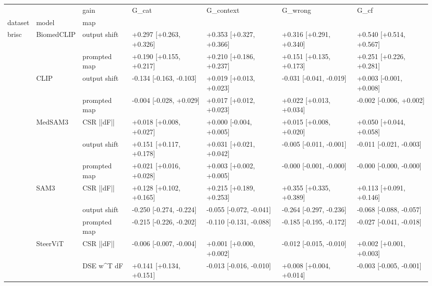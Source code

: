 \begin{tabular}{lllllll}
\toprule
 &  & gain & G_cat & G_context & G_wrong & G_cf \\
dataset & model & map &  &  &  &  \\
\midrule
\multirow[t]{13}{*}{brisc} & \multirow[t]{2}{*}{BiomedCLIP} & output shift & +0.297 [+0.263, +0.326] & +0.353 [+0.327, +0.366] & +0.316 [+0.291, +0.340] & +0.540 [+0.514, +0.567] \\
 &  & prompted map & +0.190 [+0.155, +0.217] & +0.210 [+0.186, +0.237] & +0.151 [+0.135, +0.173] & +0.251 [+0.226, +0.281] \\
\cline{2-7}
 & \multirow[t]{2}{*}{CLIP} & output shift & -0.134 [-0.163, -0.103] & +0.019 [+0.013, +0.023] & -0.031 [-0.041, -0.019] & +0.003 [-0.001, +0.008] \\
 &  & prompted map & -0.004 [-0.028, +0.029] & +0.017 [+0.012, +0.023] & +0.022 [+0.013, +0.034] & -0.002 [-0.006, +0.002] \\
\cline{2-7}
 & \multirow[t]{3}{*}{MedSAM3} & CSR  ||dF|| & +0.018 [+0.008, +0.027] & +0.000 [-0.004, +0.005] & +0.015 [+0.008, +0.020] & +0.050 [+0.044, +0.058] \\
 &  & output shift & +0.151 [+0.117, +0.178] & +0.031 [+0.021, +0.042] & -0.005 [-0.011, -0.001] & -0.011 [-0.021, -0.003] \\
 &  & prompted map & +0.021 [+0.016, +0.028] & +0.003 [+0.002, +0.005] & -0.000 [-0.001, -0.000] & -0.000 [-0.000, -0.000] \\
\cline{2-7}
 & \multirow[t]{3}{*}{SAM3} & CSR  ||dF|| & +0.128 [+0.102, +0.165] & +0.215 [+0.189, +0.253] & +0.355 [+0.335, +0.389] & +0.113 [+0.091, +0.146] \\
 &  & output shift & -0.250 [-0.274, -0.224] & -0.055 [-0.072, -0.041] & -0.264 [-0.297, -0.236] & -0.068 [-0.088, -0.057] \\
 &  & prompted map & -0.215 [-0.226, -0.202] & -0.110 [-0.131, -0.088] & -0.185 [-0.195, -0.172] & -0.027 [-0.041, -0.018] \\
\cline{2-7}
 & \multirow[t]{3}{*}{SteerViT} & CSR  ||dF|| & -0.006 [-0.007, -0.004] & +0.001 [+0.000, +0.002] & -0.012 [-0.015, -0.010] & +0.002 [+0.001, +0.003] \\
 &  & DSE  w^T dF & +0.141 [+0.134, +0.151] & -0.013 [-0.016, -0.010] & +0.008 [+0.004, +0.014] & -0.003 [-0.005, -0.001] \\

\end{tabular}
